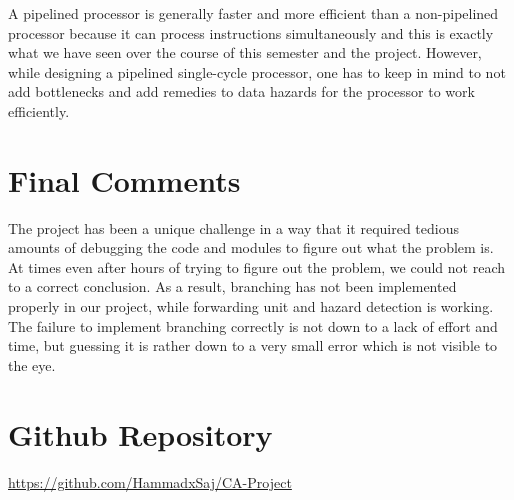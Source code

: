 \documentclass{article}
\begin{document}
A pipelined processor is generally faster and more efficient than a non-pipelined processor because it can process instructions simultaneously and this is exactly what we have seen over the course of this semester and the project. However, while designing a pipelined single-cycle processor, one has to keep in mind to not add bottlenecks and add remedies to data hazards for the processor to work efficiently.

\section{Final Comments}
The project has been a unique challenge in a way that it required tedious amounts of debugging the code and modules to figure out what the problem is. At times even after hours of trying to figure out the problem, we could not reach to a correct conclusion. As a result, branching has not been implemented properly in our project, while forwarding unit and hazard detection is working. The failure to implement branching correctly is not down to a lack of effort and time, but guessing it is rather down to a very small error which is not visible to the eye. 


\section{Github Repository}

\href{https://github.com/HammadxSaj/CA-Project}{https://github.com/HammadxSaj/CA-Project}
\end{document}

